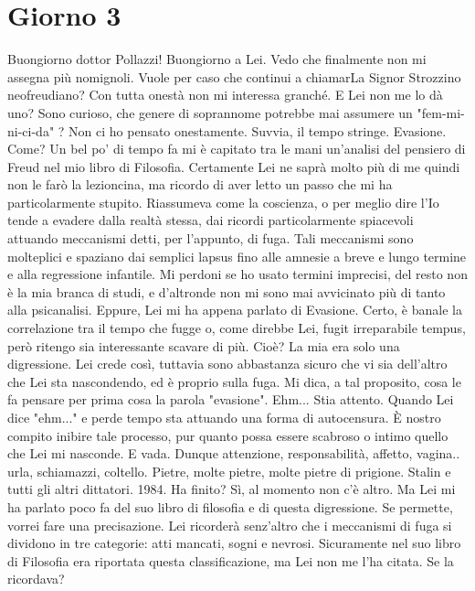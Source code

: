 \documentclass[a4paper,12pt]{article}
\newcommand{\Walter}{\speak{W}}
\newcommand{\Pollazzi}{\speak{P}}
\begin{document}
\section*{Giorno 3}
\begin{dialogue}
\Walter Buongiorno dottor Pollazzi!
\Pollazzi Buongiorno a Lei. Vedo che finalmente non mi assegna più nomignoli.
\Walter Vuole per caso che continui a chiamarLa Signor Strozzino neofreudiano?
\Pollazzi Con tutta onestà non mi interessa granché.
\Walter E Lei non me lo dà uno? Sono curioso, che genere di soprannome potrebbe mai assumere un "fem-mi-ni-ci-da" ?
\Pollazzi Non ci ho pensato onestamente. Suvvia, il tempo stringe.
\Walter Evasione.
\Pollazzi Come?
\Walter Un bel po' di tempo fa mi è capitato tra le mani un'analisi del pensiero di Freud nel mio libro di Filosofia. Certamente Lei ne saprà molto più di me quindi non le farò la lezioncina, ma ricordo di aver letto un passo che mi ha particolarmente stupito. Riassumeva come la coscienza, o per meglio dire l'Io tende a evadere dalla realtà stessa, dai ricordi particolarmente spiacevoli attuando meccanismi detti, per l'appunto, di fuga. Tali meccanismi sono molteplici e spaziano dai semplici lapsus fino alle amnesie a breve e lungo termine e alla regressione infantile. Mi perdoni se ho usato termini imprecisi, del resto non è la mia branca di studi, e d'altronde non mi sono mai avvicinato più di tanto alla psicanalisi.
\Pollazzi Eppure, Lei mi ha appena parlato di Evasione. Certo, è banale la correlazione tra il tempo che fugge o, come direbbe Lei, fugit irreparabile tempus, però ritengo sia interessante scavare di più.
\Walter Cioè? La mia era solo una digressione.
\Pollazzi Lei crede così, tuttavia sono abbastanza sicuro che vi sia dell'altro che Lei sta nascondendo, ed è proprio sulla fuga. Mi dica, a tal proposito, cosa le fa pensare per prima cosa la parola "evasione".
\Walter Ehm...
\Pollazzi Stia attento. Quando Lei dice "ehm..." e perde tempo sta attuando una forma di autocensura. È nostro compito inibire tale processo, pur quanto possa essere scabroso o intimo quello che Lei mi nasconde.
\Walter E vada. Dunque  attenzione, responsabilità, affetto, vagina.. urla, schiamazzi, coltello. Pietre, molte pietre, molte pietre di prigione. Stalin e tutti gli altri dittatori. 1984.
\Pollazzi Ha finito?
\Walter Sì, al momento non c'è altro.
\Pollazzi Ma Lei mi ha parlato poco fa del suo libro di filosofia e di questa digressione. Se permette, vorrei fare una precisazione. Lei ricorderà senz'altro che i meccanismi di fuga si dividono in tre categorie: atti mancati, sogni e nevrosi. Sicuramente nel suo libro di Filosofia era riportata questa classificazione, ma Lei non me l'ha citata. Se la ricordava?

\end{dialogue}
\end{document}
